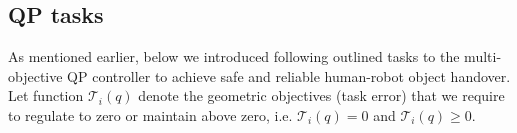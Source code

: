 

\subsection{QP tasks}\label{QPTasks}

As mentioned earlier, below we introduced following outlined tasks to the multi-objective QP controller to achieve safe and reliable human-robot object handover. Let function $\mathscr{T}_i(q)$ denote the geometric objectives (task error) that we require to regulate to zero or maintain above zero, i.e. $\mathscr{T}_i(q) = 0$ and $\mathscr{T}_i(q) \geq 0$.  

